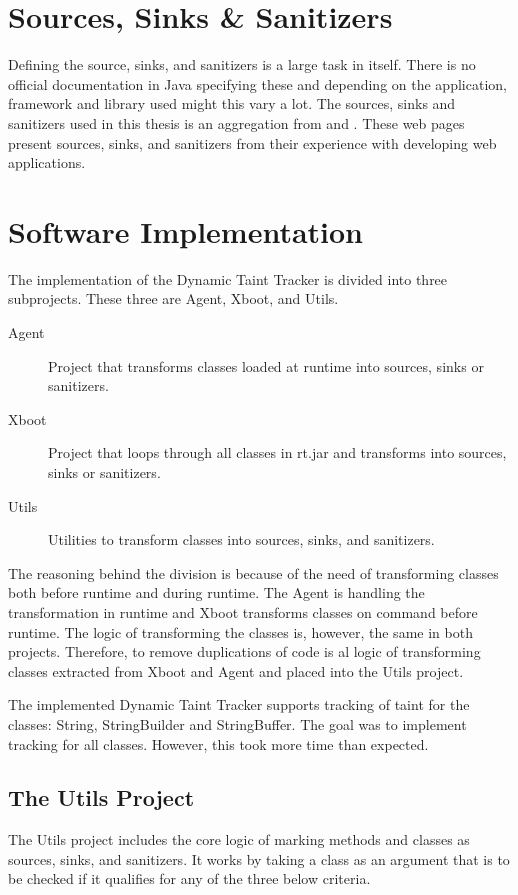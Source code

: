 \section{Sources, Sinks \& Sanitizers}
Defining the source, sinks, and sanitizers is a large task in itself. There is no official documentation in Java specifying these and depending on the application, framework and library used might this vary a lot.  The sources, sinks and sanitizers used in this thesis is an aggregation from \textcite{sssCodeMaster} and \textcite{sssOWASP}. These web pages present sources, sinks, and sanitizers from their experience with developing web applications. 



\section{Software Implementation}
\label{SoftwareArchitecture}
The implementation of the Dynamic Taint Tracker is divided into three subprojects. These three are Agent, Xboot, and Utils. 

\begin{description}
    \item[Agent] Project that transforms classes loaded at runtime into sources, sinks or sanitizers.
    \item[Xboot] Project that loops through all classes in rt.jar and transforms into sources, sinks or sanitizers.
    \item[Utils] Utilities to transform classes into sources, sinks, and sanitizers. 
\end{description}
\hfill

The reasoning behind the division is because of the need of transforming classes both before runtime and during runtime. The Agent is handling the transformation in runtime and Xboot transforms classes on command before runtime. The logic of transforming the classes is, however, the same in both projects. Therefore, to remove duplications of code is al logic of transforming classes extracted from Xboot and Agent and placed into the Utils project.

The implemented Dynamic Taint Tracker supports tracking of taint for the classes: String, StringBuilder and StringBuffer. The goal was to implement tracking for all classes. However, this took more time than expected.



\subsection{The Utils Project}
The Utils project includes the core logic of marking methods and classes as sources, sinks, and sanitizers. It works by taking a class as an argument that is to be checked if it qualifies for any of the three below criteria.

